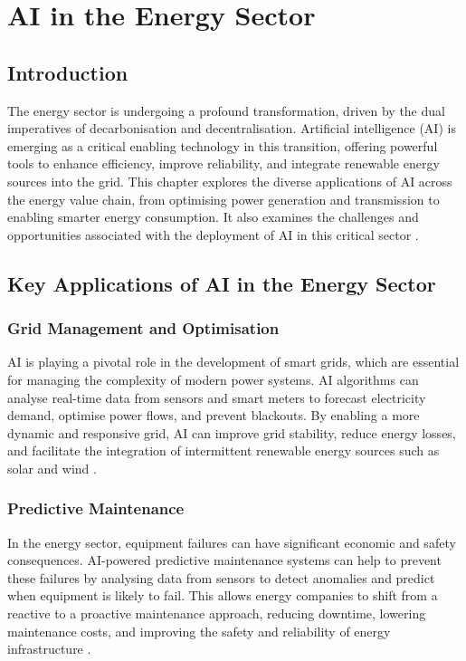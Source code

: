 \chapter{AI in the Energy Sector}
\label{cha:ai_in_energy}

\section{Introduction}

The energy sector is undergoing a profound transformation, driven by the dual imperatives of decarbonisation and decentralisation. Artificial intelligence (AI) is emerging as a critical enabling technology in this transition, offering powerful tools to enhance efficiency, improve reliability, and integrate renewable energy sources into the grid. This chapter explores the diverse applications of AI across the energy value chain, from optimising power generation and transmission to enabling smarter energy consumption. It also examines the challenges and opportunities associated with the deployment of AI in this critical sector \parencite{zepter2019review}.

\section{Key Applications of AI in the Energy Sector}

\subsection{Grid Management and Optimisation}

AI is playing a pivotal role in the development of smart grids, which are essential for managing the complexity of modern power systems. AI algorithms can analyse real-time data from sensors and smart meters to forecast electricity demand, optimise power flows, and prevent blackouts. By enabling a more dynamic and responsive grid, AI can improve grid stability, reduce energy losses, and facilitate the integration of intermittent renewable energy sources such as solar and wind \parencite{eera2025artificial}.

\subsection{Predictive Maintenance}

In the energy sector, equipment failures can have significant economic and safety consequences. AI-powered predictive maintenance systems can help to prevent these failures by analysing data from sensors to detect anomalies and predict when equipment is likely to fail. This allows energy companies to shift from a reactive to a proactive maintenance approach, reducing downtime, lowering maintenance costs, and improving the safety and reliability of energy infrastructure \parencite{aliyu2022review}.

